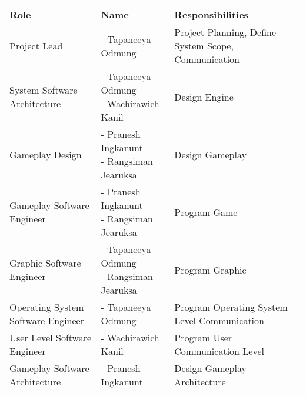 \begin{multicols}{1}
\small
\begin{minipage}{\textwidth}
    \begin{tabularx}{\textwidth}{|L|L|L|}
        \hline
        \textbf{Role} & \textbf{Name} & \textbf{Responsibilities} \\
        \hline
        Project Lead & - Tapaneeya Odmung & Project Planning, Define System Scope, Communication \\
        System Software Architecture & {- Tapaneeya Odmung \newline - Wachirawich Kanil} & Design Engine \\
        Gameplay Design & {- Pranesh Ingkanunt \newline - Rangsiman Jearuksa} & Design Gameplay \\
        Gameplay Software Engineer & {- Pranesh Ingkanunt \newline - Rangsiman Jearuksa} & Program Game \\
        Graphic Software Engineer & {- Tapaneeya Odmung \newline - Rangsiman Jearuksa} & Program Graphic \\
        Operating System Software Engineer & - Tapaneeya Odmung & Program Operating System Level Communication \\
        User Level Software Engineer & - Wachirawich Kanil & Program User Communication Level \\
        Gameplay Software Architecture & - Pranesh Ingkanunt & Design Gameplay Architecture \\
        \hline
    \end{tabularx}
\end{minipage}
\label{tab:table}
\end{multicols}

\vspace{0.5em}

